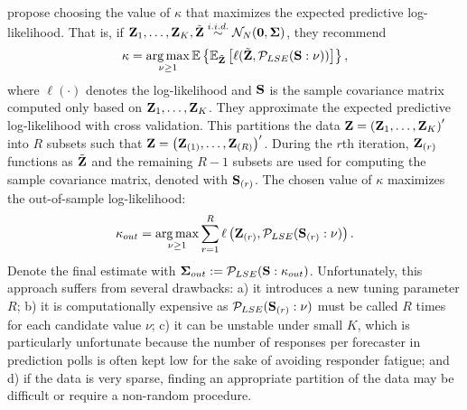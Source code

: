 \documentclass[11pt]{article}
\newcommand{\E}{\mathbb{E}}
\DeclareMathOperator*{\argmax}{arg\,max}
\theoremstyle{definition}
\theoremstyle{definition}
\def\bSigma{{\bf \Sigma}}
\def\Z{{\bf Z}}
\def\SS{{\bf S}}
\def\E{{\mathbb E}}
\begin{document}
 \cite{won2006maximum} propose choosing the value of $\kappa$ that maximizes the expected predictive log-likelihood. That is, if $\Z_1, \dots, \Z_K,  \tilde{\Z}\stackrel{i.i.d.}{\sim} \mathcal{N}_{N}(\boldsymbol{0}, \bSigma)$, they recommend $$\kappa = \argmax_{\nu \geq 1} \E \left\{ \E_{\tilde{\Z}} \left[  \ell(\tilde{\Z},  \mathcal{P}_{LSE}(\SS : \nu)) \right] \right\},$$ where $\ell(\cdot)$ denotes the log-likelihood  and $\SS$ is the sample covariance matrix computed only based on $\Z_1, \dots, \Z_K$. They approximate the expected predictive log-likelihood with cross validation. This partitions the data $\Z = \left(\Z_{1}, \dots, \Z_{K}\right)'$ into $R$ subsets such that  $\Z = \left(\Z_{(1)}, \dots, \Z_{(R)}\right)'$. During the $r$th iteration, $\Z_{(r)}$ functions as $\tilde{\Z}$ and the remaining $R-1$ subsets are used for computing the sample covariance matrix, denoted  with $\SS_{(r)}$. 
The chosen value of $\kappa$ maximizes the out-of-sample log-likelihood:
 \begin{align}
\kappa_{out} = \argmax_{\nu \geq 1} \sum_{r=1}^R \ell\left( \Z_{(r)}, \mathcal{P}_{LSE}(\SS_{(r)} : \nu)\right).
\label{kappa_out}
\end{align}
Denote the final estimate with $\bSigma_{out} := \mathcal{P}_{LSE}(\SS : \kappa_{out})$. 
Unfortunately, this approach suffers from several drawbacks: a) it introduces a new tuning parameter $R$; b) it is computationally expensive as $\mathcal{P}_{LSE}(\SS_{(r)} : \nu)$ must be called $R$ times for each candidate value $\nu$; c) it can be unstable under small $K$, which is particularly unfortunate because
 the number of responses per forecaster in prediction polls is often kept low for the sake of avoiding responder fatigue; and d) if the data is very sparse, finding an appropriate partition of the data may be difficult or require a non-random procedure. 


\end{document}
